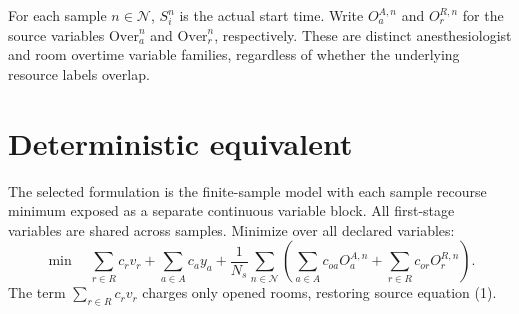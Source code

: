 \documentclass[11pt,a4paper]{article}
\begin{document}
For each sample $n\in\mathcal{N}$, $S_i^n$ is the actual start time. Write $O_a^{A,n}$ and $O_r^{R,n}$ for the source variables $\mathrm{Over}_a^n$ and $\mathrm{Over}_r^n$, respectively. These are distinct anesthesiologist and room overtime variable families, regardless of whether the underlying resource labels overlap.

\section*{Deterministic equivalent}
The selected formulation is the finite-sample model with each sample recourse minimum exposed as a separate continuous variable block. All first-stage variables are shared across samples. Minimize over all declared variables:
\begin{equation}
\min\quad
\sum_{r\in R}c_r v_r+\sum_{a\in A}c_a y_a
+\frac{1}{N_s}\sum_{n\in\mathcal{N}}
\left(\sum_{a\in A}c_{oa}O_a^{A,n}
+\sum_{r\in R}c_{or}O_r^{R,n}\right).
\end{equation}
The term $\sum_{r\in R}c_rv_r$ charges only opened rooms, restoring source equation (1).
\end{document}
